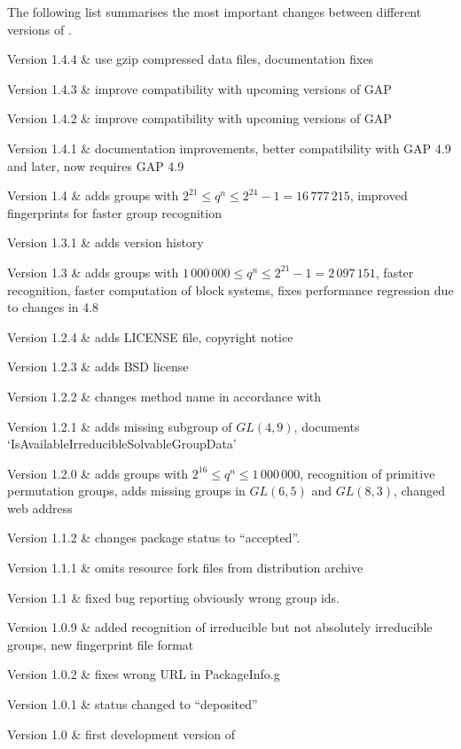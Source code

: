 
The following list summarises the most important changes between different versions of \IRREDSOL.

\beginitems
Version 1.4.4 &
	use gzip compressed data files, documentation fixes
	
Version 1.4.3 &
	improve compatibility with upcoming versions of GAP
	
Version 1.4.2 &
	improve compatibility with upcoming versions of GAP

Version 1.4.1 &
	documentation improvements, better compatibility with GAP 4.9 and later, now requires GAP 4.9

Version 1.4 &
	adds groups with $2^{21} \leq q^n \leq 2^{24} - 1 = 16\,777\,215$, improved fingerprints for faster
	group recognition

Version 1.3.1 &
	adds version history
	
Version 1.3 &
	adds groups with $1\,000\,000 \leq q^n \leq 2^{21} - 1 = 2\,097\,151$, faster recognition, faster computation of block systems, fixes performance regression due to changes in {\GAP} 4.8
	
Version 1.2.4 &
	adds LICENSE file, copyright notice
	
Version 1.2.3 & 
	adds BSD license
	
Version 1.2.2 &
	changes method name in accordance with {\GAP}
	
Version 1.2.1 &
	adds missing subgroup of $GL(4,9)$, documents `IsAvailableIrreducibleSolvableGroupData'
	
Version 1.2.0 &
	adds groups with $2^{16} \leq q^n \leq 1\,000\,000$, recognition of primitive permutation groups, adds missing groups in $GL(6,5)$ and $GL(8,3)$, changed web address

Version 1.1.2 &
	changes package status to ``accepted''.
	
Version 1.1.1 & 
	omits resource fork files from distribution archive
	
Version 1.1 &
	fixed bug reporting obviously wrong group ids.
	
Version 1.0.9 & 
	added recognition of irreducible but not absolutely irreducible groups, new fingerprint file format
	
Version 1.0.2 & 
	fixes wrong URL in PackageInfo.g
	
Version 1.0.1 &
	status changed to ``deposited''
	
Version 1.0 &
 	first development version of {\IRREDSOL}
	
\enditems

